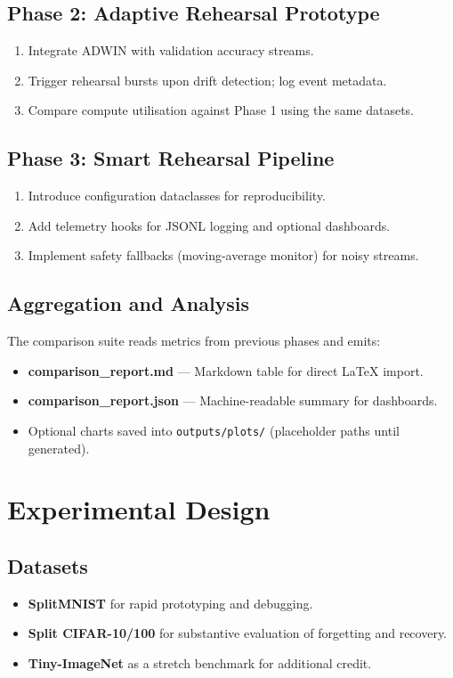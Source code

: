 \documentclass[12pt,a4paper]{article}
\begin{document}
\subsection{Phase 2: Adaptive Rehearsal Prototype}
\begin{enumerate}[label=\alph*.]
    \item Integrate ADWIN with validation accuracy streams.
    \item Trigger rehearsal bursts upon drift detection; log event metadata.
    \item Compare compute utilisation against Phase 1 using the same datasets.
\end{enumerate}

\subsection{Phase 3: Smart Rehearsal Pipeline}
\begin{enumerate}[label=\alph*.]
    \item Introduce configuration dataclasses for reproducibility.
    \item Add telemetry hooks for JSONL logging and optional dashboards.
    \item Implement safety fallbacks (moving-average monitor) for noisy streams.
\end{enumerate}

\subsection{Aggregation and Analysis}
The comparison suite reads metrics from previous phases and emits:
\begin{itemize}
    \item \textbf{comparison\_report.md} --- Markdown table for direct LaTeX import.
    \item \textbf{comparison\_report.json} --- Machine-readable summary for dashboards.
    \item Optional charts saved into \texttt{outputs/plots/} (placeholder paths until generated).
\end{itemize}

\section{Experimental Design}
\subsection{Datasets}
\begin{itemize}
    \item \textbf{SplitMNIST} for rapid prototyping and debugging.
    \item \textbf{Split CIFAR-10/100} for substantive evaluation of forgetting and recovery.
    \item \textbf{Tiny-ImageNet} as a stretch benchmark for additional credit.
\end{itemize}
\end{document}
